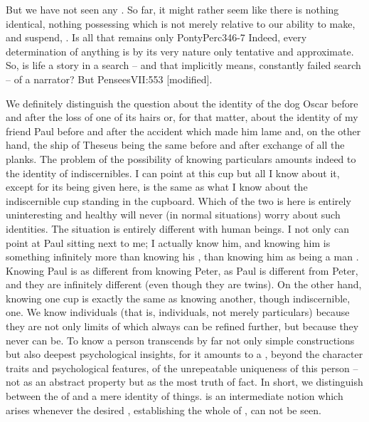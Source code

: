 
But we have not seen any . So far, it might rather seem like there is
nothing  identical, nothing possessing  which is
not merely relative to our ability to make, and suspend, .  Is
all that remains only \citet{a permanently tentative look?}{PontyPerc}{346-7}
Indeed, every  determination of anything  is by its
very nature only tentative and approximate. So, is life a story in a search --
and that implicitly means, constantly failed search -- of a
narrator? But \citet{thou wouldst not seek, if
  thou hadst not found.}{Pensees}{VII:553 [modified]}.

We definitely distinguish the question about the identity of the dog Oscar
before and after the loss of one of its hairs or, for that matter, about the
identity of my friend Paul before and after the accident which made him lame
and, on the other hand, the ship of Theseus being the same before and after
exchange of all the planks.  The problem of the possibility of knowing
particulars amounts indeed to the identity of indiscernibles. I can point at
this cup but all I know about it, except for its being  given here,
is the same as what I know about the indiscernible cup standing in the cupboard.
Which of the two is here is entirely uninteresting and healthy 
will never (in normal situations) worry about such identities. The situation is
entirely different with human beings. I not only can point at Paul sitting next
to me; I actually know him, and knowing him is something infinitely more than
knowing his , than knowing him as being a man
. Knowing Paul is as different from knowing Peter, as Paul is
different from Peter, and they are infinitely different (even though they are
twins). On the other hand, knowing one cup is exactly the same as knowing
another, though indiscernible, one.  We know individuals (that is, 
individuals, not merely particulars) because they are not only limits of
 which always can be refined further, but because they never
can be. To know a person transcends by far not only simple 
constructions but also deepest psychological insights, for it amounts to a
, beyond the character traits and psychological features, of the
unrepeatable uniqueness of this person -- not as an abstract property but as the
most  truth of fact.  In short, we distinguish between the
 of  and a mere identity of  things.
 is an intermediate notion which arises whenever the desired
, establishing the whole of , can not be
seen.

